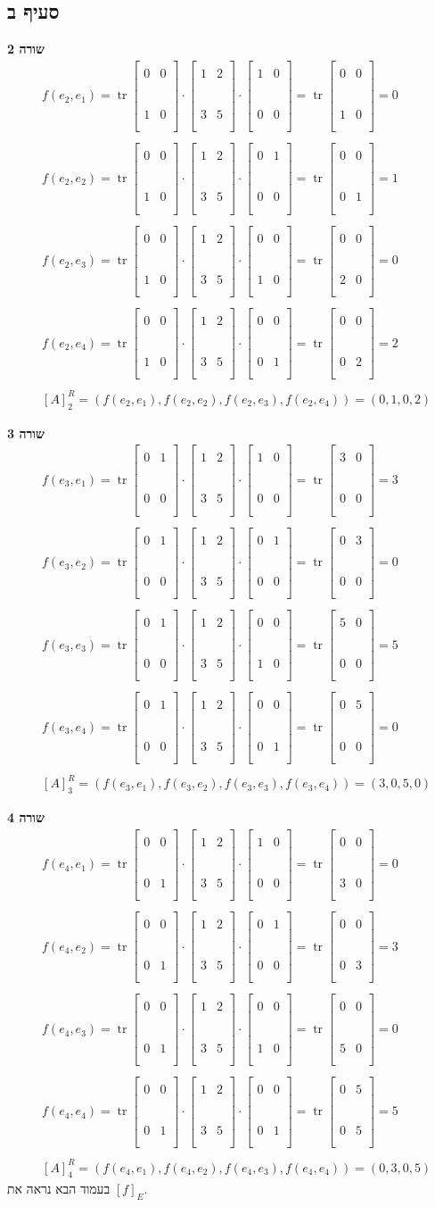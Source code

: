 \documentclass[11pt, oneside]{article}
\newcommand{\br}{\\\\\\\\\\\\}
\DeclareMathOperator{\tr}{tr}
\newcommand{\mfr}[4]{\begin{bmatrix}\\#1 & #2\br #3 & #4\\\\\end{bmatrix}}
\newcommand{\eon}{\mfr{1}{0}{0}{0}}
\newcommand{\etw}{\mfr{0}{1}{0}{0}}
\renewcommand{\eth}{\mfr{0}{0}{1}{0}}
\newcommand{\efo}{\mfr{0}{0}{0}{1}}
\def\M{\mfr{1}{2}{3}{5}}
\begin{document}
\subsection*{סעיף ב}
\textbf{שורה 2}
\begin{eqnarray*}
& f(e_{2}, e_{1}) = \tr{\eth \cdot \M \cdot \eon} = \tr\eth = 0\\\\
& f(e_{2}, e_{2}) = \tr{\eth \cdot \M \cdot \etw} = \tr\efo = 1\\\\
& f(e_{2}, e_{3}) = \tr{\eth \cdot \M \cdot \eth} = \tr\mfr{0}{0}{2}{0} = 0\\\\
& f(e_{2}, e_{4}) = \tr{\eth \cdot \M \cdot \efo} = \tr\mfr{0}{0}{0}{2} = 2\\\\
& [A]^{R}_{2} = (f(e_{2}, e_{1}), f(e_{2}, e_{2}), f(e_{2}, e_{3}), f(e_{2}, e_{4})) = (0,1,0,2)
\end{eqnarray*}

\textbf{שורה 3}
\begin{eqnarray*}
& f(e_{3}, e_{1}) = \tr{\etw \cdot \M \cdot \eon} = \tr\mfr{3}{0}{0}{0} = 3\\\\
& f(e_{3}, e_{2}) = \tr{\etw \cdot \M \cdot \etw} = \tr\mfr{0}{3}{0}{0} = 0\\\\
& f(e_{3}, e_{3}) = \tr{\etw \cdot \M \cdot \eth} = \tr\mfr{5}{0}{0}{0} = 5\\\\
& f(e_{3}, e_{4}) = \tr{\etw \cdot \M \cdot \efo} = \tr\mfr{0}{5}{0}{0} = 0\\\\
& [A]^{R}_{3} = (f(e_{3}, e_{1}), f(e_{3}, e_{2}), f(e_{3}, e_{3}), f(e_{3}, e_{4})) = (3,0,5,0)
\end{eqnarray*}

\textbf{שורה 4}
\begin{eqnarray*}
& f(e_{4}, e_{1}) = \tr{\efo \cdot \M \cdot \eon} = \tr\mfr{0}{0}{3}{0} = 0\\\\
& f(e_{4}, e_{2}) = \tr{\efo \cdot \M \cdot \etw} = \tr\mfr{0}{0}{0}{3} = 3\\\\
& f(e_{4}, e_{3}) = \tr{\efo \cdot \M \cdot \eth} = \tr\mfr{0}{0}{5}{0} = 0\\\\
& f(e_{4}, e_{4}) = \tr{\efo \cdot \M \cdot \efo} = \tr\mfr{0}{5}{0}{5} = 5\\\\
& [A]^{R}_{4} = (f(e_{4}, e_{1}), f(e_{4}, e_{2}), f(e_{4}, e_{3}), f(e_{4}, e_{4})) = (0,3,0,5)
\end{eqnarray*}
בעמוד הבא נראה את $[f]_{E}$.
\clearpage
\end{document}
